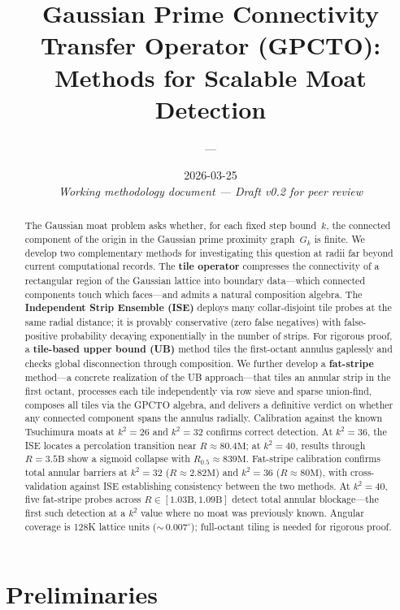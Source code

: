 \documentclass[11pt,a4paper]{article}
\title{%
  Gaussian Prime Connectivity Transfer Operator (GPCTO):\\
  Methods for Scalable Moat Detection%
}
\author{---}
\date{%
  2026-03-25\\[0.5em]
  \normalsize\textit{Working methodology document --- Draft v0.2 for peer review}%
}
\newcommand{\Gk}{G_k}
\newcommand{\Rhalf}{R_{0.5}}
\theoremstyle{definition}
\theoremstyle{plain}
\theoremstyle{remark}
\begin{document}
\maketitle

\begin{abstract}
The Gaussian moat problem asks whether, for each fixed step bound~$k$, the connected component of the origin in the Gaussian prime proximity graph~$\Gk$ is finite.
We develop two complementary methods for investigating this question at radii far beyond current computational records.
The \textbf{tile operator} compresses the connectivity of a rectangular region of the Gaussian lattice into boundary data---which connected components touch which faces---and admits a natural composition algebra.
The \textbf{Independent Strip Ensemble (ISE)} deploys many collar-disjoint tile probes at the same radial distance; it is provably conservative (zero false negatives) with false-positive probability decaying exponentially in the number of strips.
For rigorous proof, a \textbf{tile-based upper bound (UB)} method tiles the first-octant annulus gaplessly and checks global disconnection through composition.
We further develop a \textbf{fat-stripe} method---a concrete realization of the UB approach---that tiles an annular strip in the first octant, processes each tile independently via row sieve and sparse union-find, composes all tiles via the GPCTO algebra, and delivers a definitive verdict on whether any connected component spans the annulus radially.
Calibration against the known Tsuchimura moats at $k^2 = 26$ and $k^2 = 32$ confirms correct detection.
At $k^2 = 36$, the ISE locates a percolation transition near $R \approx 80.4\text{M}$; at $k^2 = 40$, results through $R = 3.5\text{B}$ show a sigmoid collapse with $\Rhalf \approx 839\text{M}$.
Fat-stripe calibration confirms total annular barriers at $k^2 = 32$ ($R \approx 2.82\text{M}$) and $k^2 = 36$ ($R \approx 80\text{M}$), with cross-validation against ISE establishing consistency between the two methods.
At $k^2 = 40$, five fat-stripe probes across $R \in [1.03\text{B}, 1.09\text{B}]$ detect total annular blockage---the first such detection at a $k^2$ value where no moat was previously known.  Angular coverage is 128K lattice units (${\sim}\,0.007^\circ$); full-octant tiling is needed for rigorous proof.
\end{abstract}

\section{Preliminaries}\label{sec:preliminaries}
\end{document}
